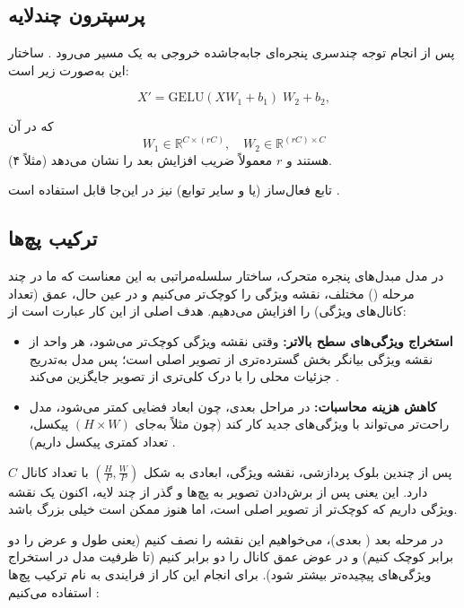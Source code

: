 \subsection{پرسپترون چندلایه}
پس از انجام توجه چندسری پنجره‌ای جابه‌جاشده
خروجی به یک مسیر \textbf{} می‌رود \cite{liu2021swintransformer}. ساختار این  به‌صورت زیر است:

\begin{equation}
	X' = \mathrm{GELU}(X W_1 + b_1) \; W_2 + b_2,
	\label{eq:gelu_transform}
\end{equation}

که در آن
\[
W_1 \in \mathbb{R}^{C \times (rC)},
\quad
W_2 \in \mathbb{R}^{(rC) \times C}
\]
هستند و \(\displaystyle r\) معمولاً ضریب افزایش بعد را نشان می‌دهد (مثلاً ۴).

تابع فعال‌ساز  (یا  و سایر توابع) نیز در این‌جا قابل استفاده است \cite{hendrycks2016gelu}.

\subsection{ترکیب پچ‌ها}
در مدل مبدل‌های پنجره متحرک، ساختار سلسله‌مراتبی به این معناست که ما در چند مرحله () مختلف، نقشه ویژگی را کوچک‌تر می‌کنیم و در عین حال، عمق (تعداد کانال‌های ویژگی) را افزایش می‌دهیم. هدف اصلی از این کار عبارت است از:

\begin{itemize}
	\item \textbf{استخراج ویژگی‌های سطح بالاتر:}
	وقتی نقشه ویژگی کوچک‌تر می‌شود، هر واحد از نقشه ویژگی بیانگر بخش گسترده‌تری از تصویر اصلی است؛
	پس مدل به‌تدریج جزئیات محلی را با درک کلی‌تری از تصویر جایگزین می‌کند \cite{he2016deep}.
	
	\item \textbf{کاهش هزینه محاسبات:}
	در مراحل بعدی، چون ابعاد فضایی کمتر می‌شود، مدل راحت‌تر می‌تواند با ویژگی‌های جدید کار کند
	(چون مثلاً به‌جای \((H \times W)\) پیکسل، تعداد کمتری پیکسل داریم) \cite{liu2021swintransformer}.
\end{itemize}

پس از چندین بلوک پردازشی، نقشه ویژگی، ابعادی به شکل \((\tfrac{H}{P}, \tfrac{W}{P})\) با تعداد کانال \(\displaystyle C\) دارد.
این یعنی پس از برش‌دادن تصویر به پچ‌ها و گذر از چند لایه، اکنون یک نقشه ویژگی داریم که کوچک‌تر از تصویر اصلی است،
اما هنوز ممکن است خیلی بزرگ باشد.

در مرحله بعد ( بعدی)، می‌خواهیم این نقشه را نصف کنیم
(یعنی طول و عرض را دو برابر کوچک کنیم) و در عوض عمق کانال را دو برابر کنیم
(تا ظرفیت مدل در استخراج ویژگی‌های پیچیده‌تر بیشتر شود). برای انجام این کار از فرایندی به نام
ترکیب پچ‌ها استفاده می‌کنیم \cite{liu2021swintransformer}:

